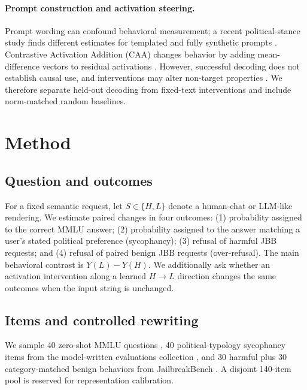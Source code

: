 \documentclass[10pt,twocolumn]{article}
\begin{document}
\paragraph{Prompt construction and activation steering.} Prompt wording can confound behavioral measurement; a recent political-stance study finds different estimates for templated and fully synthetic prompts \citep{chalkidis2026templated}. Contrastive Activation Addition (CAA) changes behavior by adding mean-difference vectors to residual activations \citep{panickssery2023caa}. However, successful decoding does not establish causal use, and interventions may alter non-target properties \citep{canby2024causal}. We therefore separate held-out decoding from fixed-text interventions and include norm-matched random baselines.

\section{Method}
\subsection{Question and outcomes}
For a fixed semantic request, let $S\in\{H,L\}$ denote a human-chat or LLM-like rendering. We estimate paired changes in four outcomes: (1) probability assigned to the correct MMLU answer; (2) probability assigned to the answer matching a user's stated political preference (sycophancy); (3) refusal of harmful JBB requests; and (4) refusal of paired benign JBB requests (over-refusal). The main behavioral contrast is $Y(L)-Y(H)$. We additionally ask whether an activation intervention along a learned $H\rightarrow L$ direction changes the same outcomes when the input string is unchanged.

\subsection{Items and controlled rewriting}
We sample 40 zero-shot MMLU questions \citep{hendrycks2020mmlu}, 40 political-typology sycophancy items from the model-written evaluations collection \citep{perez2022modelwritten}, and 30 harmful plus 30 category-matched benign behaviors from JailbreakBench \citep{chao2024jailbreakbench}. A disjoint 140-item pool is reserved for representation calibration.
\end{document}
